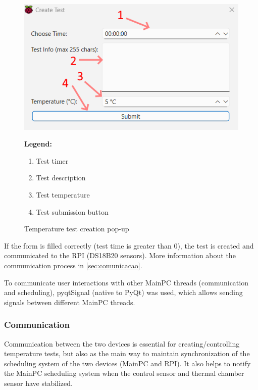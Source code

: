 \begin{figure}[H]
    \centering
    \begin{minipage}{0.6\textwidth}
        \includegraphics[width=\linewidth]{figures/gui_2.png}
    \end{minipage}%
    \hfill
    \begin{minipage}{0.35\textwidth}
        \small
        \textbf{Legend:}
        \begin{enumerate}
            \item Test timer
            \item Test description
            \item Test temperature
            \item Test submission button
        \end{enumerate}
    \end{minipage}
    \caption{Temperature test creation pop-up}
    \label{fig:gui_2}
\end{figure}

If the form is filled correctly (test time is greater than 0), the test is created and communicated to the RPI (DS18B20 sensors). More information about the communication process in \autoref{sec:comunicacao}.

To communicate user interactions with other MainPC threads (communication and scheduling), pyqtSignal (native to PyQt) was used, which allows sending signals between different MainPC threads.

\subsubsection{Communication}     \label{sec:comunicacao}

Communication between the two devices is essential for creating/controlling temperature tests, but also as the main way to maintain synchronization of the scheduling system of the two devices (MainPC and RPI). It also helps to notify the MainPC scheduling system when the control sensor and thermal chamber sensor have stabilized.

